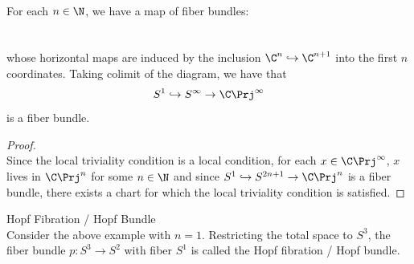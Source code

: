 \documentclass[a4paper]{article}
\begin{document}
\begin{eg}{}{}\\
For each $n\in\N$, we have a map of fiber bundles: \\~\\
\\whose horizontal maps are induced by the inclusion $\C^n\hookrightarrow\C^{n+1}$ into the first $n$ coordinates. Taking colimit of the diagram, we have that $$S^1\hookrightarrow S^\infty\to\C\Prj^\infty$$ is a fiber bundle. 
\begin{proof}\\
Since the local triviality condition is a local condition, for each $x\in\C\Prj^\infty$, $x$ lives in $\C\Prj^n$ for some $n\in\N$ and since $S^1\hookrightarrow S^{2n+1}\to\C\Prj^n$ is a fiber bundle, there exists a chart for which the local triviality condition is satisfied. 
\end{proof}
\end{eg}

\begin{eg}{Hopf Fibration / Hopf Bundle}{}\\
Consider the above example with $n=1$. Restricting the total space to $S^3$, the fiber bundle $p:S^3\to S^2$ with fiber $S^1$ is called the Hopf fibration / Hopf bundle. 
\end{eg}
\end{document}
